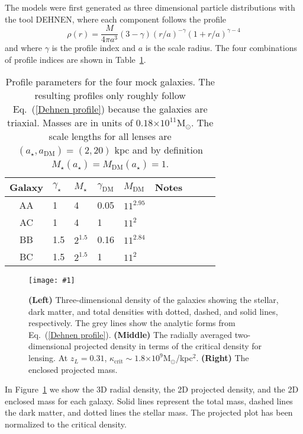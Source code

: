\documentclass[onecolumn,galley]{mn2e}
\newcommand{\Msun}{\ensuremath{\mathrm{M}_\odot}}
\newcommand{\tabref}[1] {Table~\ref{#1}}
\newcommand{\figref}[1] {Figure~\ref{#1}}
\newcommand{\eqnref}[1] {Eq.~(\ref{#1})}
\newcommand{\e}[1]{\ensuremath{\times 10^{#1}}}
\newcommand\plotone[1]{%
 \centering
 \leavevmode
 \texttt{[image: \#1]}%
}%
\begin{document}
The models were
first generated as three dimensional particle distributions with the
tool DEHNEN, where each component follows the profile
\begin{equation}
\rho(r) = \frac{M}{4\pi a^3}(3-\gamma){(r/a)^{-\gamma}(1 + r/a)^{\gamma-4}}
\label{Dehnen profile}
\end{equation}
and where $\gamma$ is the profile index and $a$ is the scale radius. The
four combinations of profile indices are shown in \tabref{Lens profile params}.

\begin{table}
\begin{tabular}{cllllllll}
Galaxy & $\gamma_\star$ & $M_\star$ & $\gamma_\mathrm{DM}$ & $M_\mathrm{DM}$ & Notes\\
\hline
AA & 1 & 4 & 0.05 & $11^{2.95}$ & \\
AC & 1 & 4 & 1 & $11^2$ & \\
BB & 1.5 & $2^{1.5}$ & 0.16 & $11^{2.84}$ & \\
BC & 1.5 & $2^{1.5}$ & 1 & $11^2$ & 
\end{tabular}
\caption{Profile parameters for the four mock galaxies. The resulting profiles only roughly follow
\eqnref{Dehnen profile} because the galaxies are triaxial. Masses are in units of $0.18\e{11}\Msun$. The scale lengths for
all lenses are $(a_\star,a_\mathrm{DM})=(2,20)$ kpc and by definition
$M_\star(a_\star) = M_\mathrm{DM}(a_\star) = 1$.}
\label{Lens profile params}
\end{table}


\begin{figure}
\plotone{cmp_simulations.pdf}
\caption{
\textbf{(Left)} 
Three-dimensional density of the galaxies showing the stellar, dark matter,
and total densities with dotted, dashed, and solid lines, respectively. The
grey lines show the analytic forms from \eqnref{Dehnen profile}. 
\textbf{(Middle)} 
The radially averaged two-dimensional projected density in terms of the
critical density for lensing. At $z_L=0.31$, $\kappa_\mathrm{crit}\sim 1.8\e{9}$\Msun/kpc$^2$.
\textbf{(Right)}
The enclosed projected mass.
}
\label{mock galaxies}
\end{figure}

In \figref{mock galaxies} we show the 3D radial density, 
the 2D projected density, and the 2D enclosed mass for each
galaxy. Solid lines represent the total mass, dashed lines the dark 
matter, and dotted lines the stellar mass. The projected plot has
been normalized to the critical density.
\end{document}
